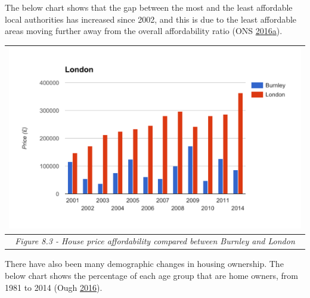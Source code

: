 \documentclass[]{tufte-handout}
\begin{document}
The below chart shows that the gap between the most and the least
affordable local authorities has increased since 2002, and this is due
to the least affordable areas moving further away from the overall
affordability ratio (ONS
\protect\hyperlink{ref-ONS2016a}{2016}\protect\hyperlink{ref-ONS2016a}{a}).

\begin{longtable}[]{@{}c@{}}
\toprule
\begin{minipage}[b]{0.97\columnwidth}\centering
\includegraphics{ChapterPictures/8-3-Housepriceaffordability.png}\strut
\end{minipage}\tabularnewline
\midrule
\endhead
\begin{minipage}[t]{0.97\columnwidth}\centering
\emph{Figure 8.3 - House price affordability compared between Burnley
and London}\strut
\end{minipage}\tabularnewline
\bottomrule
\end{longtable}

There have also been many demographic changes in housing ownership. The
below chart shows the percentage of each age group that are home owners,
from 1981 to 2014 (Ough \protect\hyperlink{ref-Ough2016}{2016}).
\end{document}
